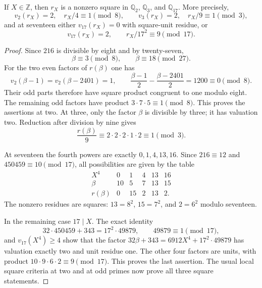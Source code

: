 \begin{lemma}\label{sn:local-squares}
If $X\in\mathbb Z$, then $r_X$ is a nonzero square in
$\mathbb Q_2$, $\mathbb Q_3$, and $\mathbb Q_{17}$.
More precisely,
\[
 v_2(r_X)=2,\quad r_X/4\equiv1\pmod8,
 \qquad
 v_3(r_X)=2,\quad r_X/9\equiv1\pmod3,
\]
and at seventeen either $v_{17}(r_X)=0$ with square-unit
residue, or
\[
                    v_{17}(r_X)=2,\qquad
                    r_X/17^2\equiv9\pmod{17}.
\]
\end{lemma}
\begin{proof}
Since $216$ is divisible by eight and by twenty-seven,
\[
                    \beta\equiv3\pmod8,
                    \qquad\beta\equiv18\pmod{27}.
\]
For the two even factors of $r(\beta)$ one has
\[
 v_2(\beta-1)=v_2(\beta-2401)=1,
 \qquad
 \frac{\beta-1}{2}-\frac{\beta-2401}{2}=1200\equiv0\pmod8.
\]
Their odd parts therefore have square product congruent to one
modulo eight.  The remaining odd factors have product
$3\cdot7\cdot5\equiv1\pmod8$.  This proves the assertions
at two.  At three, only the factor $\beta$ is divisible by
three; it has valuation two.  Reduction after division by nine
gives
\[
 \frac{r(\beta)}9\equiv
       2\cdot2\cdot2\cdot1\cdot2\equiv1\pmod3.
\]

At seventeen the fourth powers are exactly $0,1,4,13,16$.
Since $216\equiv12$ and $450459\equiv10\pmod{17}$, all
possibilities are given by the table
\[
\begin{array}{c|rrrrr}
 X^4&0&1&4&13&16\\\hline
 \beta&10&5&7&13&15\\
 r(\beta)&0&15&2&13&2.
\end{array}
\]
The nonzero residues are squares: $13=8^2$, $15=7^2$, and
$2=6^2$ modulo seventeen.

In the remaining case $17\mid X$.  The exact identity
\[
 32\cdot450459+343=17^2\cdot49879,
 \qquad 49879\equiv1\pmod{17},
\]
and $v_{17}(X^4)\ge4$ show that the factor
$32\beta+343=6912X^4+17^2\cdot49879$ has valuation exactly
two and unit residue one.  The other four factors are units,
with product
$10\cdot9\cdot6\cdot2\equiv9\pmod{17}$.
This proves the last assertion.  The usual local square criteria
at two and at odd primes now prove all three square statements.
\end{proof}

